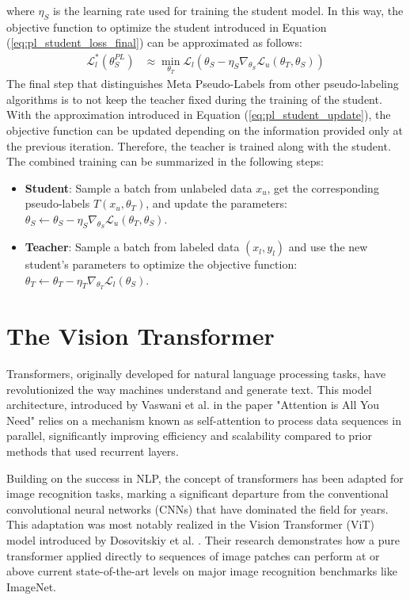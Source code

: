 where $\eta_S$ is the learning rate used for training the student model.
In this way, the objective function to optimize the student introduced in 
Equation (\ref{eq:pl_student_loss_final}) can be approximated as follows:
\begin{align}
    \mathcal{L}^*_l(\theta_S^{PL}) &\approx \min_{\theta_T} \mathcal{L}_l(\theta_S - \eta_S \nabla_{\theta_S} \mathcal{L}_u(\theta_T, \theta_S))
    \label{eq:pl_student_loss_final_approx}
\end{align}
The final step that distinguishes Meta Pseudo-Labels from other pseudo-labeling 
algorithms is to not keep the teacher fixed during the training of the student. 
With the approximation introduced in Equation (\ref{eq:pl_student_update}), 
the objective function can be updated depending on the information provided only 
at the previous iteration.
Therefore, the teacher is trained along with the student.
The combined training can be summarized in the following steps:

\begin{itemize}
    \item \textbf{Student}: Sample a batch from unlabeled data $x_u$, get the 
    corresponding pseudo-labels $T(x_u, \theta_T)$, and update the parameters: 
    $\theta_S \leftarrow \theta_S - \eta_S \nabla_{\theta_S} \mathcal{L}_u(\theta_T, \theta_S)$.
    \item \textbf{Teacher}: Sample a batch from labeled data $(x_l, y_l)$ and 
    use the new student's parameters to optimize the objective function:
    $\theta_T \leftarrow \theta_T - \eta_T \nabla_{\theta_T} \mathcal{L}_l(\theta_S)$.
\end{itemize}


\section{The Vision Transformer}

Transformers, originally developed for natural language processing tasks, have 
revolutionized the way machines understand and generate text. 
This model architecture, introduced by Vaswani et al. in the paper 
"Attention is All You Need" \cite{attention_is_all_you_need} relies on a 
mechanism known as self-attention to 
process data sequences in parallel, significantly improving efficiency and 
scalability compared to prior methods that used recurrent layers.

Building on the success in NLP, the concept of transformers has been adapted 
for image recognition tasks, marking a significant departure from the 
conventional convolutional neural networks (CNNs) that have dominated the field 
for years. This adaptation was most notably realized in the Vision Transformer 
(ViT) model introduced by Dosovitskiy et al. \cite{vit}. Their research demonstrates how a 
pure transformer applied directly to sequences of image patches can perform at 
or above current state-of-the-art levels on major image recognition benchmarks 
like ImageNet.

